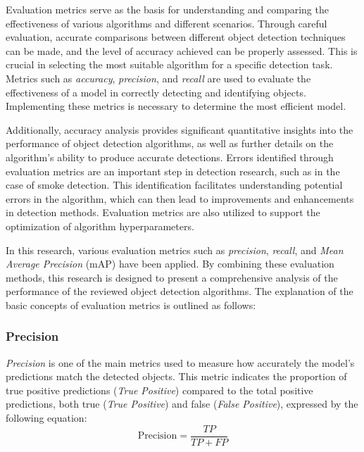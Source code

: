 Evaluation metrics serve as the basis for understanding and comparing the effectiveness of various algorithms and different scenarios. Through careful evaluation, accurate comparisons between different object detection techniques can be made, and the level of accuracy achieved can be properly assessed. This is crucial in selecting the most suitable algorithm for a specific detection task. Metrics such as \emph{accuracy}, \emph{precision}, and \emph{recall} are used to evaluate the effectiveness of a model in correctly detecting and identifying objects. Implementing these metrics is necessary to determine the most efficient model.

Additionally, accuracy analysis provides significant quantitative insights into the performance of object detection algorithms, as well as further details on the algorithm's ability to produce accurate detections. Errors identified through evaluation metrics are an important step in detection research, such as in the case of smoke detection. This identification facilitates understanding potential errors in the algorithm, which can then lead to improvements and enhancements in detection methods. Evaluation metrics are also utilized to support the optimization of algorithm hyperparameters.

In this research, various evaluation metrics such as \emph{precision}, \emph{recall}, and \emph{Mean Average Precision} (mAP) have been applied. By combining these evaluation methods, this research is designed to present a comprehensive analysis of the performance of the reviewed object detection algorithms. The explanation of the basic concepts of evaluation metrics is outlined as follows:

\vspace{5pt}
\subsubsection{Precision}
\label{subsubsec:precision}

\emph{Precision} is one of the main metrics used to measure how accurately the model's predictions match the detected objects. This metric indicates the proportion of true positive predictions (\emph{True Positive}) compared to the total positive predictions, both true (\emph{True Positive}) and false (\emph{False Positive}), expressed by the following equation:
\begin{equation}
  \mathrm{Precision} = \frac{TP}{TP + FP}
\end{equation}

